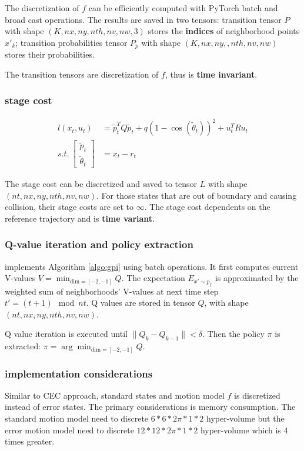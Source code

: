\documentclass[conference]{IEEEtran}
\begin{document}
The discretization of $f$ can be efficiently computed with PyTorch batch and broad cast operations.
The results are saved in two tensors:
transition tensor $P$ with shape $(K, nx, ny, nth, nv, nw, 3)$ 
stores the \textbf{indices} of neighborhood points $x'_k$;
transition probabilities tensor $P_p$ with shape $(K, nx, ny, ,nth, nv, nw)$ 
stores their probabilities.

The transition tensors are discretization of $f$, thus is \textbf{time invariant}.

\subsubsection{stage cost}
$$
\begin{aligned}
l(x_t, u_t) &= 
    \tilde{p}^{T}_{t}Q\tilde{p}_{t} 
    + q\left( 1-\cos \left( \tilde{\theta}_{t}  \right)  \right)^{2} 
    + u^{T}_{t}Ru_{t} \\
s.t. \ \left[ \begin{gathered}\tilde{p}_{t}\\ \tilde{\theta}_{t} \end{gathered}  \right] 
    &= x_{t}-r_{t}
\end{aligned}
$$

The stage cost can be discretized and saved to tensor $L$ with shape $(nt, nx, ny, nth, nv, nw)$.
For those states that are out of boundary and causing collision, 
their stage costs are set to $\infty$.
The stage cost dependents on the reference trajectory and is \textbf{time variant}.

\subsubsection{Q-value iteration and policy extraction}
implements Algorithm \ref{algo:gpi} using batch operations.
It first computes current V-values $V = \min_{\text{dim}=[-2,-1]} Q$.
The expectation $E_{x' \sim p_f}$ is approximated by the weighted sum of 
neighborhoods' V-values at next time step $t' = (t+1)\mod nt$.
Q values are stored in tensor $Q$, with shape $(nt, nx, ny, nth, nv, nw)$.

Q value iteration is executed until $\|Q_k - Q_{k-1}\| < \delta$.
Then the policy $\pi$ is extracted: $\pi = \arg\min_{\text{dim}=[-2,-1]} Q$.

\subsubsection{implementation considerations}
Similar to CEC approach, 
standard states and motion model $f$ is discretized instead of error states.
The primary considerations is memory consumption.
The standard motion model need to discrete $6*6*2\pi*1*2$ hyper-volume 
but the error motion model need to discrete $12*12*2\pi*1*2$ hyper-volume which is 4 times greater.
\end{document}
